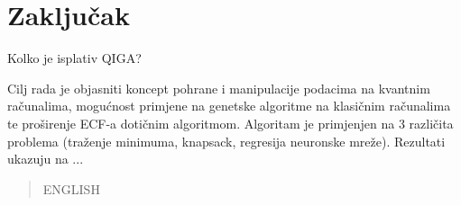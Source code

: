 \documentclass[times, utf8, zavrsni]{fer}
\begin{document}
\newpage

\chapter{Zaključak}
Kolko je isplativ QIGA?




\begin{sazetak}
Cilj rada je objasniti koncept pohrane i manipulacije podacima na kvantnim računalima, mogućnost primjene na genetske algoritme na klasičnim računalima te proširenje ECF-a dotičnim algoritmom. Algoritam je primjenjen na 3 različita problema (traženje minimuma, knapsack, regresija neuronske mreže). Rezultati ukazuju na ...

\end{sazetak}

\begin{abstract}
ENGLISH

\end{abstract}
\end{document}
